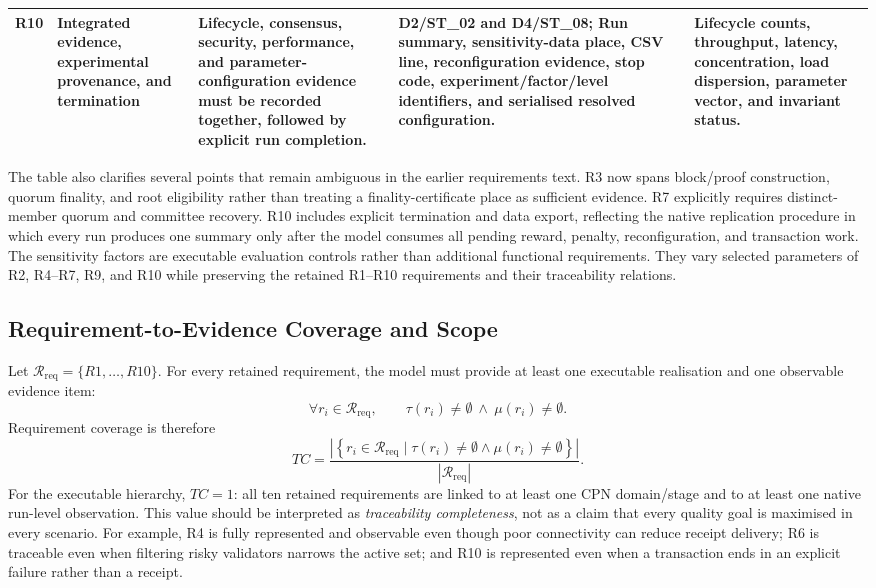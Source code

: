\documentclass[a4paper,fleqn]{cas-sc}
\begin{document}
\begin{table}[pos=t]
\begin{tabularx}{\textwidth}{p{0.65cm}p{2.5cm}p{3.5cm}p{4.4cm}X}
R10 & Integrated evidence, experimental provenance, and termination & Lifecycle, consensus, security, performance, and parameter-configuration evidence must be recorded together, followed by explicit run completion. & D2/ST\_02 and D4/ST\_08; Run summary, sensitivity-data place, CSV line, reconfiguration evidence, stop code, experiment/factor/level identifiers, and serialised resolved configuration. & Lifecycle counts, throughput, latency, concentration, load dispersion, parameter vector, and invariant status. \\
\bottomrule
\end{tabularx}
\end{table}

The table also clarifies several points that remain ambiguous in the earlier
requirements text. R3 now spans block/proof construction, quorum finality, and
root eligibility rather than treating a finality-certificate place as sufficient
evidence. R7 explicitly requires distinct-member quorum and committee recovery.
R10 includes explicit termination and data export, reflecting the native
replication procedure in which every run produces one summary only after the model consumes all pending
reward, penalty, reconfiguration, and transaction work. The sensitivity factors are executable evaluation controls rather than additional functional requirements. They vary selected parameters of R2, R4--R7, R9, and R10 while preserving the retained R1--R10 requirements and their traceability relations.

\subsection{Requirement-to-Evidence Coverage and Scope}
\label{subsec:traceability}

Let
\(
\mathcal{R}_{\mathrm{req}}=\{R1,\ldots,R10\}
\).
For every retained requirement, the model must provide at least one executable
realisation and one observable evidence item:
\begin{equation}
\forall r_i\in\mathcal{R}_{\mathrm{req}},\qquad
\tau(r_i)\neq\emptyset\ \wedge\ \mu(r_i)\neq\emptyset.
\end{equation}
Requirement coverage is therefore
\begin{equation}
TC=
\frac{
\left|\left\{r_i\in\mathcal{R}_{\mathrm{req}}\mid
\tau(r_i)\neq\emptyset\wedge\mu(r_i)\neq\emptyset\right\}\right|
}{|\mathcal{R}_{\mathrm{req}}|}.
\end{equation}
For the executable hierarchy, $TC=1$: all ten retained requirements are linked to
at least one CPN domain/stage and to at least one native run-level observation.
This value should be interpreted as \emph{traceability completeness}, not as a
claim that every quality goal is maximised in every scenario. For example, R4
is fully represented and observable even though poor connectivity can reduce
receipt delivery; R6 is traceable even when filtering risky validators narrows
the active set; and R10 is represented even when a transaction ends in an
explicit failure rather than a receipt.
\end{document}
